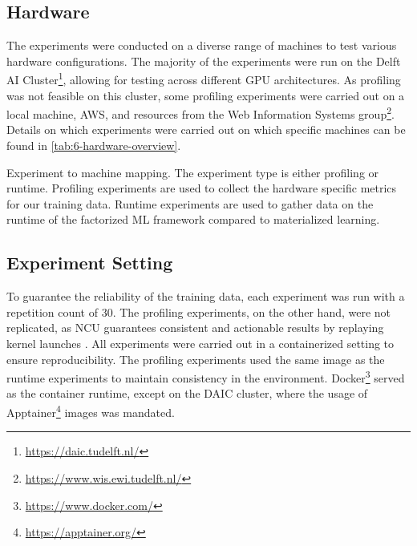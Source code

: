 \subsection{Hardware}
\label{subsec:6-hardware}
The experiments were conducted on a diverse range of machines to test various hardware configurations. The majority of the experiments were run on the Delft AI Cluster\footnote{\url{https://daic.tudelft.nl/}}, allowing for testing across different GPU architectures. As profiling was not feasible on this cluster, some profiling experiments were carried out on a local machine, AWS, and resources from the Web Information Systems group\footnote{\url{https://www.wis.ewi.tudelft.nl/}}. Details on which experiments were carried out on which specific machines can be found in \autoref{tab:6-hardware-overview}.

\begin{table}[ht]
    \centering
    
    \caption[Experiment to machine mapping]{Experiment to machine mapping. The experiment type is either profiling or runtime. Profiling experiments are used to collect the hardware specific metrics for our training data. Runtime experiments are used to gather data on the runtime of the factorized ML framework compared to materialized learning.}
    \label{tab:6-hardware-overview}
\end{table}

\subsection{Experiment Setting}
To guarantee the reliability of the training data, each experiment was run with a repetition count of $30$. The profiling experiments, on the other hand, were not replicated, as NCU guarantees consistent and actionable results by replaying kernel launches \cite{nsight_compute}. All experiments were carried out in a containerized setting to ensure reproducibility. The profiling experiments used the same image as the runtime experiments to maintain consistency in the environment. Docker\footnote{\url{https://www.docker.com/}} served as the container runtime, except on the DAIC cluster, where the usage of Apptainer\footnote{\url{https://apptainer.org/}} images was mandated.

